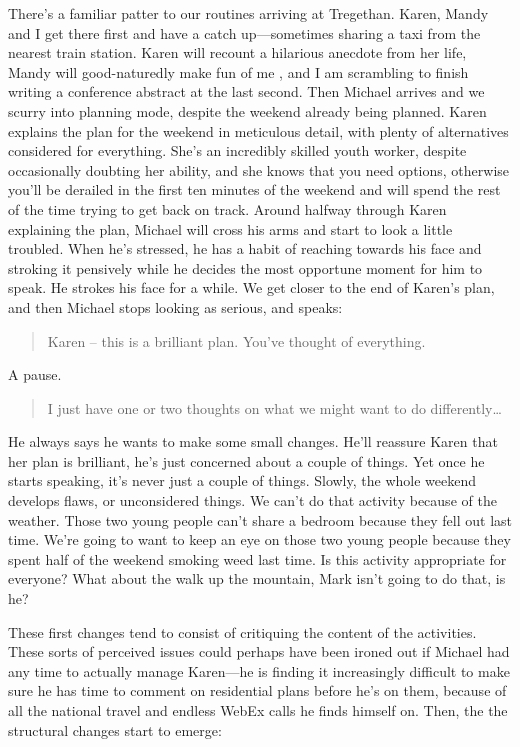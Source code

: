 There's a familiar patter to our routines arriving at Tregethan. Karen, Mandy and I get there first and have a catch up—sometimes sharing a taxi from the nearest train station. Karen will recount a hilarious anecdote from her life, Mandy will good-naturedly make fun of me , and I am scrambling to finish writing a conference abstract at the last second. Then Michael arrives and we scurry into planning mode, despite the weekend already being planned. Karen explains the plan for the weekend in meticulous detail, with plenty of alternatives considered for everything. She's an incredibly skilled youth worker, despite occasionally doubting her ability, and she knows that you need options, otherwise you'll be derailed in the first ten minutes of the weekend and will spend the rest of the time trying to get back on track. Around halfway through Karen explaining the plan, Michael will cross his arms and start to look a little troubled. When he’s stressed, he has a habit of reaching towards his face and stroking it pensively while he decides the most opportune moment for him to speak. He strokes his face for a while. We get closer to the end of Karen’s plan, and then Michael stops looking as serious, and speaks:
\begin{quote}
Karen – this is a brilliant plan. You’ve thought of everything.
\end{quote}
A pause. 
\begin{quote}
I just have one or two thoughts on what we might want to do differently…
\end{quote}
He always says he wants to make some small changes. He'll reassure Karen that her plan is brilliant, he’s just concerned about a couple of things. Yet once he starts speaking, it’s never just a couple of things. Slowly, the whole weekend develops flaws, or unconsidered things. We can’t do that activity because of the weather. Those two young people can’t share a bedroom because they fell out last time. We’re going to want to keep an eye on those two young people because they spent half of the weekend smoking weed last time. Is this activity appropriate for everyone? What about the walk up the mountain, Mark isn’t going to do that, is he? 

These first changes tend to consist of critiquing the content of the activities. These sorts of perceived issues could perhaps have been ironed out if Michael had any time to actually manage Karen—he is finding it increasingly difficult to make sure he has time to comment on residential plans before he's on them, because of all the national travel and endless WebEx calls he finds himself on. Then, the the structural changes start to emerge:

